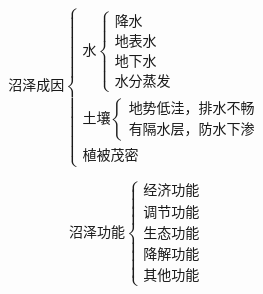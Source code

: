\documentclass[UTF8]{ctexart}
\begin{document}
\par

\begin{multicols}{2}

    \[
        \textbf{沼泽成因}
        \begin{cases}
            \text{水}
            \begin{cases}
                \text{降水}\\
                \text{地表水}\\
                \text{地下水}\\
                \text{水分蒸发}
            \end{cases}\\
            \text{土壤}
            \begin{cases}
                \text{地势低洼，排水不畅}\\
                \text{有隔水层，防水下渗}
            \end{cases}\\
            \text{植被茂密}
        \end{cases}
    \]

    \[
        \textbf{沼泽功能}
        \begin{cases}
            \text{经济功能}\\
            \text{调节功能}\\
            \text{生态功能}\\
            \text{降解功能}\\
            \text{其他功能}
        \end{cases}
    \]

\end{multicols}

\end{document}
